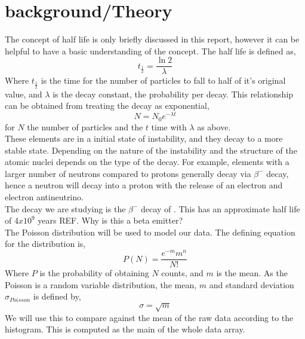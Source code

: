\documentclass[11pt]{article}
\begin{document}
    \section{background/Theory}
    The concept of half life is only briefly discussed in this report, however it can be helpful to have a basic understanding of the concept. The half life is defined as,
    \begin{equation}
        t_{\frac{1}{2}} = \frac{\ln{2}}{\lambda}
    \end{equation}
    Where $ t_{\frac{1}{2}}$ is the time for the number of particles to fall to half of it's original value, and $\lambda$ is the decay constant, the probability per decay. This relationship can be obtained from treating the decay as exponential, 
    $$N = N_0 e^{-\lambda t}$$
    for $N$ the number of particles and the $t$ time with $\lambda$ as above. 
   \\
   These elements are in a initial state of instability, and they decay to a more stable state. Depending on the nature of the instability and the structure of the atomic nuclei depends on the type of the decay. For example, elements with a larger number of neutrons compared to protons generally decay via $\beta^{-}$ decay, hence a neutron will decay into a proton with the release of an electron and electron antineutrino. 
   \\
   The decay we are studying is the $\beta^{-}$ decay of . This has an approximate half life of $4 x 10^9$ years REF. Why is this a beta emitter?
   \\
    The Poisson distribution will be used to model our data. The defining equation for the distribution is, 
    \begin{equation}
        P(N) = \frac{e^{-m}m^{n}}{N!}
    \end{equation}
    Where $P$ is the probability of obtaining $N$ counts, and $m$ is the mean.
    As the Poisson is a random variable distribution, the mean, $m$ and standard deviation $\sigma_{Poisson}$ is defined by,
    \begin{equation}
        \sigma = \sqrt{m}
    \end{equation}
    We will use this to compare against the mean of the raw data according to the histogram. This is computed as the main of the whole data array. 
\end{document}
